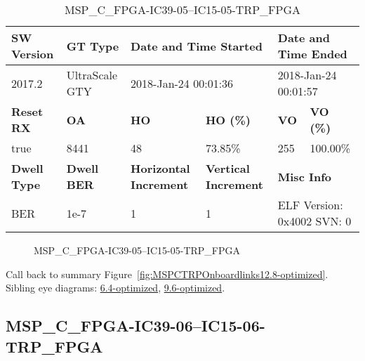 \begin{table}[h]
\centering
\caption{MSP\_C\_FPGA-IC39-05--IC15-05-TRP\_FPGA}
\label{tab:MSPCFPGAIC3905IC1505TRPFPGA12.8-optimized}
\begin{tabular}{@{}|l|l|l|l|l|l|@{}}
\toprule
\textbf{SW Version}                & \textbf{GT Type}   & \multicolumn{2}{l|}{\textbf{Date and Time Started}}            & \multicolumn{2}{l|}{\textbf{Date and Time Ended}}        \\ \midrule
2017.2                       & UltraScale GTY          & \multicolumn{2}{l|}{2018-Jan-24 00:01:36}                   & \multicolumn{2}{l|}{2018-Jan-24 00:01:57}               \\ \midrule
\textbf{Reset RX}                  & \textbf{OA} & \textbf{HO}   & \textbf{HO (\%)} & \textbf{VO} & \textbf{VO (\%)} \\ \midrule
true & 8441        & 48          & 73.85\%        & 255        & 100.00\%       \\ \midrule
\textbf{Dwell Type}                & \textbf{Dwell BER} & \textbf{Horizontal Increment} & \textbf{Vertical Increment}    & \multicolumn{2}{l|}{\textbf{Misc Info}}                  \\ \midrule
BER                            & 1e-7        & 1        & 1           & \multicolumn{2}{l|}{ELF Version: 0x4002 SVN: 0}                         \\ \bottomrule
\end{tabular}
\end{table}

\begin{figure}[h]
\caption{MSP\_C\_FPGA-IC39-05--IC15-05-TRP\_FPGA} \label{fig:MSPCFPGAIC3905IC1505TRPFPGA12.8-optimized}
\end{figure}

Call back to summary Figure~\ref{fig:MSPCTRPOnboardlinks12.8-optimized}.
Sibling eye diagrams: \hyperref[sec:MSPCFPGAIC3905IC1505TRPFPGA6.4-optimized]{6.4-optimized}, \hyperref[sec:MSPCFPGAIC3905IC1505TRPFPGA9.6-optimized]{9.6-optimized}.

\clearpage
\newpage


\subsection{MSP\_C\_FPGA-IC39-06--IC15-06-TRP\_FPGA}\label{sec:MSPCFPGAIC3906IC1506TRPFPGA12.8-optimized}

